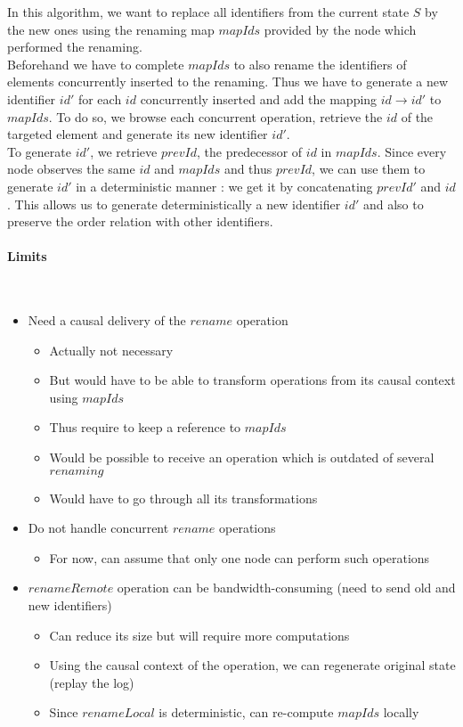 \documentclass[a4paper]{article}
\begin{document}
In this algorithm, we want to replace all identifiers from the current state $S$
by the new ones using the renaming map $mapIds$ provided by the node which
performed the renaming.\\
Beforehand we have to complete $mapIds$ to also rename the identifiers of elements
concurrently inserted to the renaming. Thus we have to generate a new identifier
$id'$ for each $id$ concurrently inserted and add the mapping $id \to id'$ to $mapIds$.
To do so, we browse each concurrent operation, retrieve the $id$ of the targeted
element and generate its new identifier $id'$.\\
To generate $id'$, we retrieve $prevId$, the predecessor of $id$ in $mapIds$.
Since every node observes the same $id$ and $mapIds$ and thus $prevId$, we can use them to
generate $id'$ in a deterministic manner : we get it by concatenating $prevId'$ and $id$.
This allows us to generate deterministically a new identifier $id'$
and also to preserve the order relation with other identifiers.

\paragraph{Limits}~\\

\begin{itemize}
  \item Need a causal delivery of the $rename$ operation
  \begin{itemize}
    \item Actually not necessary
    \item But would have to be able to transform operations from its causal context using $mapIds$
    \item Thus require to keep a reference to $mapIds$
    \item Would be possible to receive an operation which is outdated of several $renaming$
    \item Would have to go through all its transformations
  \end{itemize}
  \item Do not handle concurrent $rename$ operations
  \begin{itemize}
    \item For now, can assume that only one node can perform such operations
  \end{itemize}
  \item $renameRemote$ operation can be bandwidth-consuming (need to send old and new identifiers)
  \begin{itemize}
    \item Can reduce its size but will require more computations
    \item Using the causal context of the operation, we can regenerate original state (replay the log)
    \item Since $renameLocal$ is deterministic, can re-compute $mapIds$ locally
  \end{itemize}
\end{itemize}
\end{document}
